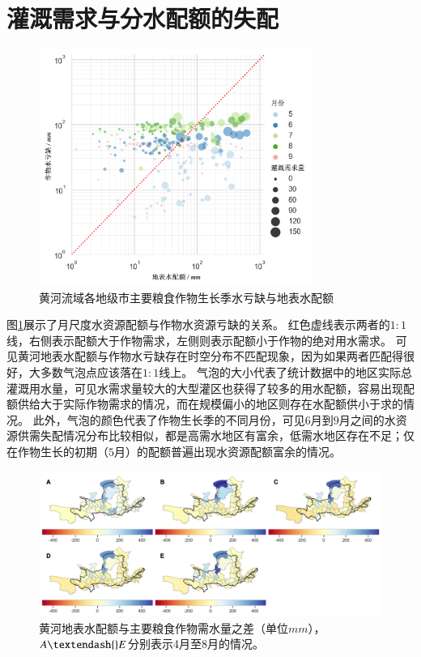 \section{灌溉需求与分水配额的失配}

\begin{figure}[!ht]
    \centering
    \includegraphics[width=0.8\textwidth]{img/ch6/ch6_matches.png}
    \caption{黄河流域各地级市主要粮食作物生长季水亏缺与地表水配额}\label{ch6:fig:matches}
\end{figure}

图\ref{ch6:fig:matches}展示了月尺度水资源配额与作物水资源亏缺的关系。
红色虚线表示两者的$1:1$线，右侧表示配额大于作物需求，左侧则表示配额小于作物的绝对用水需求。
可见黄河地表水配额与作物水亏缺存在时空分布不匹配现象，因为如果两者匹配得很好，大多数气泡点应该落在$1:1$线上。
气泡的大小代表了统计数据中的地区实际总灌溉用水量，可见水需求量较大的大型灌区也获得了较多的用水配额，容易出现配额供给大于实际作物需求的情况，而在规模偏小的地区则存在水配额供小于求的情况。
此外，气泡的颜色代表了作物生长季的不同月份，可见$6$月到$9$月之间的水资源供需失配情况分布比较相似，都是高需水地区有富余，低需水地区存在不足；仅在作物生长的初期（$5$月）的配额普遍出现水资源配额富余的情况。

\begin{figure}[!ht]
    \centering
    \includegraphics[width=\textwidth]{img/ch6/ch6_deficits_map.png}
    \caption[黄河地表水配额与主要粮食作物需水量之差]{黄河地表水配额与主要粮食作物需水量之差（单位$mm$），$A \textendash{} E$分别表示4月至8月的情况。}\label{ch6:fig:deficits_maps}
\end{figure}

